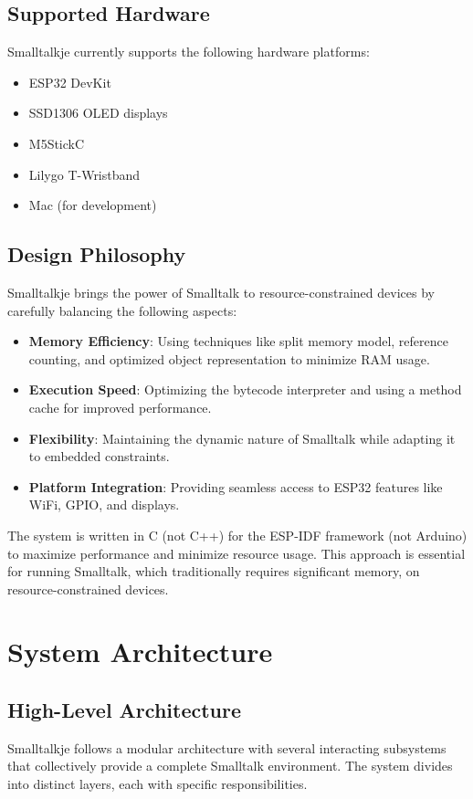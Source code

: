 \documentclass[12pt,a4paper]{report}
\begin{document}
\section{Supported Hardware}
Smalltalkje currently supports the following hardware platforms:
\begin{itemize}
    \item ESP32 DevKit
    \item SSD1306 OLED displays
    \item M5StickC
    \item Lilygo T-Wristband
    \item Mac (for development)
\end{itemize}

\section{Design Philosophy}
Smalltalkje brings the power of Smalltalk to resource-constrained devices by carefully balancing the following aspects:

\begin{itemize}
    \item \textbf{Memory Efficiency}: Using techniques like split memory model, reference counting, and optimized object representation to minimize RAM usage.
    \item \textbf{Execution Speed}: Optimizing the bytecode interpreter and using a method cache for improved performance.
    \item \textbf{Flexibility}: Maintaining the dynamic nature of Smalltalk while adapting it to embedded constraints.
    \item \textbf{Platform Integration}: Providing seamless access to ESP32 features like WiFi, GPIO, and displays.
\end{itemize}

The system is written in C (not C++) for the ESP-IDF framework (not Arduino) to maximize performance and minimize resource usage. This approach is essential for running Smalltalk, which traditionally requires significant memory, on resource-constrained devices.

\chapter{System Architecture}

\section{High-Level Architecture}
Smalltalkje follows a modular architecture with several interacting subsystems that collectively provide a complete Smalltalk environment. The system divides into distinct layers, each with specific responsibilities.
\end{document}
